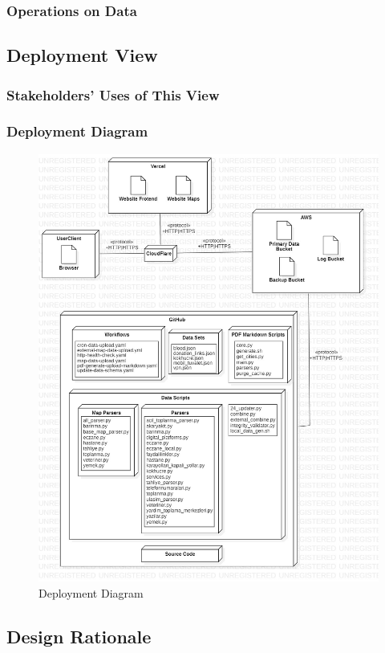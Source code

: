 \subsubsection{Operations on Data}

\subsection{Deployment View}

\subsubsection{Stakeholders' Uses of This View}

\subsubsection{Deployment Diagram}

\begin{figure}[H]
  \centering
  \includegraphics[width=\linewidth]{img/deployment-diagram.jpg}
  \caption{Deployment Diagram}
\end{figure}

\subsection{Design Rationale}

